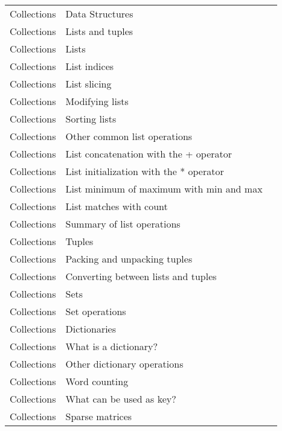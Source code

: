 \documentclass[10pt,a4paper]{article}
\begin{document}
\begin{landscape}
\begin{longtable}{|l|l|l|}
Collections & Data Structures & \cite{gorelick2020high} \\
    Collections & Lists and tuples & \cite{gorelick2020high} \\
    Collections & Lists & \cite{ceder2018quick} \\
    Collections & List indices & \cite{ceder2018quick} \\
    Collections & List slicing & \cite{ceder2018quick} \\
    Collections & Modifying lists & \cite{ceder2018quick} \\
    Collections & Sorting lists & \cite{ceder2018quick} \\
    Collections & Other common list operations & \cite{ceder2018quick} \\
    Collections & List concatenation with the + operator & \cite{ceder2018quick} \\
    Collections & List initialization with the * operator & \cite{ceder2018quick} \\
    Collections & List minimum of maximum with min and max & \cite{ceder2018quick} \\
    Collections & List matches with count & \cite{ceder2018quick} \\
    Collections & Summary of list operations & \cite{ceder2018quick} \\
    Collections & Tuples & \cite{ceder2018quick} \\
    Collections & Packing and unpacking tuples & \cite{ceder2018quick} \\
    Collections & Converting between lists and tuples & \cite{ceder2018quick} \\
    Collections & Sets & \cite{ceder2018quick} \\
    Collections & Set operations & \cite{ceder2018quick} \\
    Collections & Dictionaries & \cite{ceder2018quick} \\
    Collections & What is a dictionary? & \cite{ceder2018quick} \\
    Collections & Other dictionary operations & \cite{ceder2018quick} \\
    Collections & Word counting & \cite{ceder2018quick} \\
    Collections & What can be used as key? & \cite{ceder2018quick} \\
    Collections & Sparse matrices & \cite{ceder2018quick} \\
    

\end{longtable}
\end{landscape}
\end{document}
